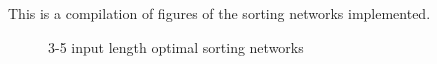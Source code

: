 This is a compilation of figures of the sorting networks implemented.
\begin{figure}[htb]
 \centering
    \begin{subfigure}[b]{0.3\textwidth}
        \centering
        \begin{sortingnetwork}{3}{0.4}
            \addtocounter{sncolumncounter}{2}
            \addtocounter{sncolumncounter}{2}
        \end{sortingnetwork}
    \end{subfigure}
    \begin{subfigure}[b]{0.3\textwidth}
        \centering
        \begin{sortingnetwork}{4}{0.4}
            \addtocounter{sncolumncounter}{2}
            \addtocounter{sncolumncounter}{2}
        \end{sortingnetwork}
    \end{subfigure}
    \begin{subfigure}[b]{0.33\textwidth}
        \centering
        \begin{sortingnetwork}{5}{0.4}
            \addtocounter{sncolumncounter}{2}
            \addtocounter{sncolumncounter}{2}
            \addtocounter{sncolumncounter}{2}
            \addtocounter{sncolumncounter}{2}
        \end{sortingnetwork}
    \end{subfigure}
 \caption{3-5 input length optimal sorting networks \cite{ron-zeno}}
 \label{fig:sort-5}
\end{figure}


